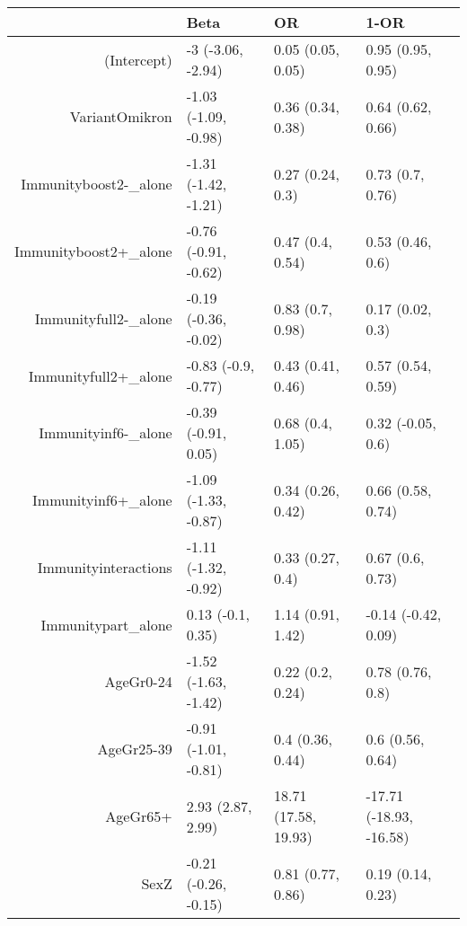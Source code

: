 \begin{table}[ht]
\centering
\begin{tabular}{rlll}
  \hline
 & Beta & OR & 1-OR \\ 
  \hline
(Intercept) & -3 (-3.06, -2.94) & 0.05 (0.05, 0.05) & 0.95 (0.95, 0.95) \\ 
  VariantOmikron & -1.03 (-1.09, -0.98) & 0.36 (0.34, 0.38) & 0.64 (0.62, 0.66) \\ 
  Immunityboost2-\_alone & -1.31 (-1.42, -1.21) & 0.27 (0.24, 0.3) & 0.73 (0.7, 0.76) \\ 
  Immunityboost2+\_alone & -0.76 (-0.91, -0.62) & 0.47 (0.4, 0.54) & 0.53 (0.46, 0.6) \\ 
  Immunityfull2-\_alone & -0.19 (-0.36, -0.02) & 0.83 (0.7, 0.98) & 0.17 (0.02, 0.3) \\ 
  Immunityfull2+\_alone & -0.83 (-0.9, -0.77) & 0.43 (0.41, 0.46) & 0.57 (0.54, 0.59) \\ 
  Immunityinf6-\_alone & -0.39 (-0.91, 0.05) & 0.68 (0.4, 1.05) & 0.32 (-0.05, 0.6) \\ 
  Immunityinf6+\_alone & -1.09 (-1.33, -0.87) & 0.34 (0.26, 0.42) & 0.66 (0.58, 0.74) \\ 
  Immunityinteractions & -1.11 (-1.32, -0.92) & 0.33 (0.27, 0.4) & 0.67 (0.6, 0.73) \\ 
  Immunitypart\_alone & 0.13 (-0.1, 0.35) & 1.14 (0.91, 1.42) & -0.14 (-0.42, 0.09) \\ 
  AgeGr0-24 & -1.52 (-1.63, -1.42) & 0.22 (0.2, 0.24) & 0.78 (0.76, 0.8) \\ 
  AgeGr25-39 & -0.91 (-1.01, -0.81) & 0.4 (0.36, 0.44) & 0.6 (0.56, 0.64) \\ 
  AgeGr65+ & 2.93 (2.87, 2.99) & 18.71 (17.58, 19.93) & -17.71 (-18.93, -16.58) \\ 
  SexZ & -0.21 (-0.26, -0.15) & 0.81 (0.77, 0.86) & 0.19 (0.14, 0.23) \\ 
   \hline
\end{tabular}
\end{table}

